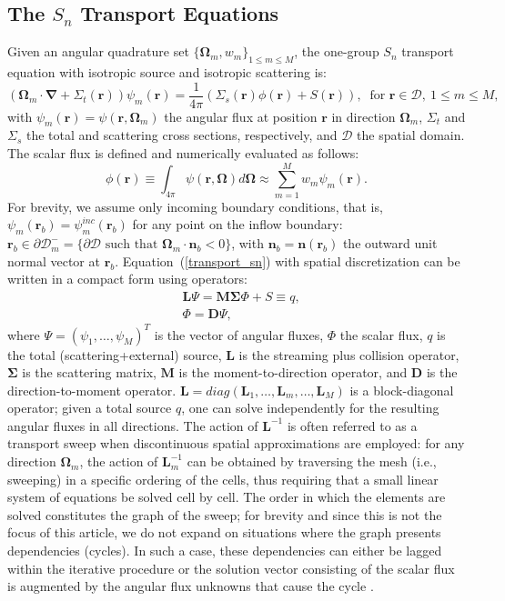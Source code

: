 \documentclass[preprint,10pt]{elsarticle}
\newcommand\grad{\boldsymbol{\nabla}}
\newcommand\bo{\boldsymbol{\Omega}}
\newcommand\br{\mathbf{r}}
\newcommand\bs{\boldsymbol}
\newcommand\mc{\mathcal}
\renewcommand{\(}{\left(}
\renewcommand{\)}{\right)}
\renewcommand{\[}{\left[}
\renewcommand{\]}{\right]}
\newcommand{\sn}{\ensuremath{S_n}\xspace}
\newcommand\vn{\bs{n}}
\begin{document}
\subsection{The \sn Transport Equations}
Given an angular quadrature set $\{\bo _m,w_m\}_{1\leq m \leq M}$, the one-group
\sn transport equation with isotropic source and isotropic scattering is:
%
\begin{equation}
  \( \bo_m\cdot \grad + \Sigma_t(\br) \) \psi_m (\br) = \frac{1}{4\pi} \left( \Sigma_s
  (\br) \phi(\br) + S (\br) \right), \ \textrm{ for } \br \in \mc{D},\
  1 \leq m \leq M,
  \label{transport_sn}
\end{equation}
%
with $\psi_m(\br) = \psi(\br,\bo_m)$ the angular flux at position $\br$ in
direction $\bo_m$, $\Sigma_t$ and $\Sigma_s$ the total and scattering cross
sections, respectively, and $\mc{D}$ the spatial domain. The scalar flux is
defined and numerically evaluated as follows:
%
\begin{equation}
  \phi(\br) \equiv \int_{4\pi} \psi(\br,\bo) d\bo \approx \sum_{m=1}^M w_m
  \psi_m (\br).
\end{equation}
%
For brevity, we assume only incoming boundary conditions, that is, $\psi_m(\br_b) =
\psi_m^{inc}(\br_b)$ for any point on the inflow boundary: $\br_b \in \partial \mc{D}_m^-
= \{\partial \mc{D} \textrm{ such that }\bo_m \cdot \vn_b <0\}$, with
$\vn_b = \vn(\br_b)$ the outward unit normal vector at $\br_b$. 
Equation~\textup {(\ref {transport_sn})} with spatial discretization can be written in a compact form using operators:
%
\begin{align}
  & \bs{L} \Psi = \bs{M \Sigma}\Phi + S \equiv q, \label{L_Psi}\\
  &\Phi = \bs{D} \Psi, \label{Phi}
\end{align}
%
where $\Psi=(\psi_1,\ldots,\psi_M)^T$ is the vector of angular fluxes, $\Phi$ the scalar flux,
$q$ is the total (scattering+external) source, $\bs{L}$ is the streaming plus collision
operator, $\bs{\Sigma}$ is the scattering matrix, $\bs{M}$ is the
moment-to-direction operator, and $\bs{D}$ is the direction-to-moment
operator. $\bs{L} = diag(\bs{L}_1,\hdots,\bs{L}_m,\hdots,\bs{L}_M)$ is 
a block-diagonal operator; given a total source $q$, one can solve independently 
for the resulting angular
fluxes in all directions. The action of $\bs{L}^{-1}$ is often referred to as
a transport sweep when discontinuous spatial approximations are
employed:  for any direction $\bo_m$, the action of $\bs{L}_m^{-1}$ can
be obtained by traversing the mesh (i.e., sweeping) in a specific ordering of
the cells, thus requiring that a small linear system of equations be solved 
cell by cell. The order in which the elements are solved constitutes the graph
of the sweep; for brevity and since this is not the focus of this article,
we do not expand on situations where the graph presents dependencies
(cycles). In such a case, these dependencies can either be lagged within the
iterative procedure \cite{dgfem} or the solution vector consisting of the scalar 
flux is augmented by the angular flux unknowns that cause the cycle \cite{mip}.
\end{document}
